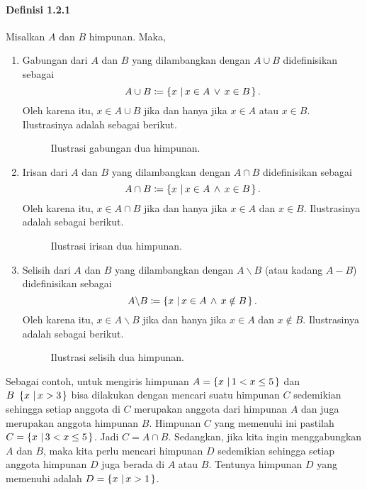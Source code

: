 \paragraph{Definisi 1.2.1 \label{def121}} Misalkan $ A $ dan $ B $ himpunan. Maka,
\begin{enumerate}
	\item Gabungan dari $ A $ dan $ B $ yang dilambangkan dengan $ A \cup B $ didefinisikan sebagai
	\[ A \cup B \coloneqq \mathop{}\!\left\lbrace{{x} \, \left|\, {x \in A \, \vee \, x \in B}\right.}\right\rbrace. \]
	Oleh karena itu, $ x \in A \cup B $ jika dan hanya jika $ x \in A $ atau $ x \in B $. Ilustrasinya adalah sebagai berikut.
	\begin{figure}[H]
		\centering
		\begin{venndiagram2sets}
			\fillA \fillB
		\end{venndiagram2sets}
		\caption{Ilustrasi gabungan dua himpunan.}
	\end{figure}
	\item Irisan dari $ A $ dan $ B $ yang dilambangkan dengan $ A \cap B $ didefinisikan sebagai
	\[ A \cap B \coloneqq \mathop{}\!\left\lbrace{{x} \, \left|\, {x \in A \, \wedge \, x \in B}\right.}\right\rbrace. \]
	Oleh karena itu, $ x \in A \cap B $ jika dan hanya jika $ x \in A $ dan $ x \in B $. Ilustrasinya adalah sebagai berikut.
	\begin{figure}[H]
		\centering
		\begin{venndiagram2sets}
			\fillACapB
		\end{venndiagram2sets}
		\caption{Ilustrasi irisan dua himpunan.}
	\end{figure}
	\item Selisih dari $ A $ dan $ B $ yang dilambangkan dengan $ A \backslash B $ (atau kadang $ A - B $) didefinisikan sebagai
	\[ A \backslash B \coloneqq \mathop{}\!\left\lbrace{{x} \, \left|\, {x \in A \, \wedge \, x \notin B}\right.}\right\rbrace. \]
	Oleh karena itu, $ x \in A \backslash B $ jika dan hanya jika $ x \in A $ dan $ x \notin B $. Ilustrasinya adalah sebagai berikut.
	\begin{figure}[H]
		\centering
		\begin{venndiagram2sets}
			\fillANotB
		\end{venndiagram2sets}
		\caption{Ilustrasi selisih dua himpunan.}
	\end{figure}
\end{enumerate}

\par Sebagai contoh, untuk mengiris himpunan $ A = \mathop{}\!\left\lbrace{{x} \, \left|\, {1 < x \leq 5}\right.}\right\rbrace $ dan $ B \ \set{x}{x > 3} $ bisa dilakukan dengan mencari suatu himpunan $ C $ sedemikian sehingga setiap anggota di $ C $ merupakan anggota dari himpunan $ A $ dan juga merupakan anggota himpunan $ B $. Himpunan $ C $ yang memenuhi ini pastilah $ C = \mathop{}\!\left\lbrace{{x} \, \left|\, {3 < x \leq 5}\right.}\right\rbrace $. Jadi $ C = A \cap B $. Sedangkan, jika kita ingin menggabungkan $ A $ dan $ B $, maka kita perlu mencari himpunan $ D $ sedemikian sehingga setiap anggota himpunan $ D $ juga berada di $ A $ atau $ B $. Tentunya himpunan $ D $ yang memenuhi adalah $ D = \mathop{}\!\left\lbrace{{x} \, \left|\, {x > 1}\right.}\right\rbrace $.

